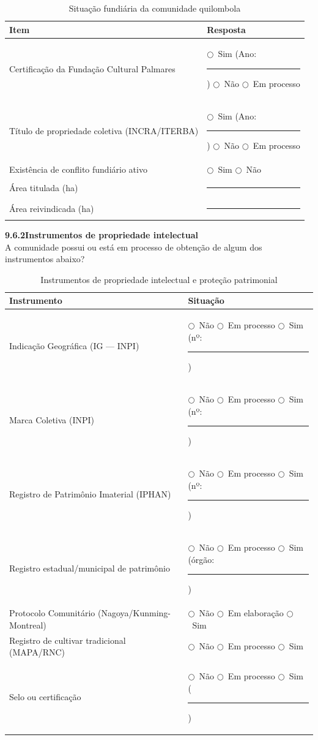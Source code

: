\begin{table}[htbp]
\centering\small
\caption{Situação fundiária da comunidade quilombola}
\label{tab:app_fundiaria}
\begin{tabular}{p{6cm}p{6.5cm}}
\toprule
\textbf{Item} & \textbf{Resposta} \\
\midrule
Certificação da Fundação Cultural Palmares & $\bigcirc$~Sim (Ano: \rule{1.5cm}{0.4pt}) \quad $\bigcirc$~Não \quad $\bigcirc$~Em processo \\
Título de propriedade coletiva (INCRA/ITERBA) & $\bigcirc$~Sim (Ano: \rule{1.5cm}{0.4pt}) \quad $\bigcirc$~Não \quad $\bigcirc$~Em processo \\
Existência de conflito fundiário ativo & $\bigcirc$~Sim \quad $\bigcirc$~Não \\
Área titulada (ha) & \rule{3cm}{0.4pt} \\
Área reivindicada (ha) & \rule{3cm}{0.4pt} \\
\bottomrule
\end{tabular}
\end{table}

\medskip\noindent\textbf{9.6.2\quad Instrumentos de propriedade intelectual}\\[2pt]
A comunidade possui ou está em processo de obtenção de algum dos instrumentos abaixo?

\begin{table}[htbp]
\centering\small
\caption{Instrumentos de propriedade intelectual e proteção patrimonial}
\label{tab:app_pi}
\begin{tabular}{p{5.5cm}p{7cm}}
\toprule
\textbf{Instrumento} & \textbf{Situação} \\
\midrule
Indicação Geográfica (IG --- INPI) & $\bigcirc$~Não \quad $\bigcirc$~Em processo \quad $\bigcirc$~Sim (nº: \rule{1.5cm}{0.4pt}) \\
Marca Coletiva (INPI) & $\bigcirc$~Não \quad $\bigcirc$~Em processo \quad $\bigcirc$~Sim (nº: \rule{1.5cm}{0.4pt}) \\
Registro de Patrimônio Imaterial (IPHAN) & $\bigcirc$~Não \quad $\bigcirc$~Em processo \quad $\bigcirc$~Sim (nº: \rule{1.5cm}{0.4pt}) \\
Registro estadual/municipal de patrimônio & $\bigcirc$~Não \quad $\bigcirc$~Em processo \quad $\bigcirc$~Sim (órgão: \rule{1.5cm}{0.4pt}) \\
Protocolo Comunitário (Nagoya/Kunming-Montreal) & $\bigcirc$~Não \quad $\bigcirc$~Em elaboração \quad $\bigcirc$~Sim \\
Registro de cultivar tradicional (MAPA/RNC) & $\bigcirc$~Não \quad $\bigcirc$~Em processo \quad $\bigcirc$~Sim \\
Selo ou certificação & $\bigcirc$~Não \quad $\bigcirc$~Em processo \quad $\bigcirc$~Sim (\rule{2cm}{0.4pt}) \\
\bottomrule
\end{tabular}
\end{table}

